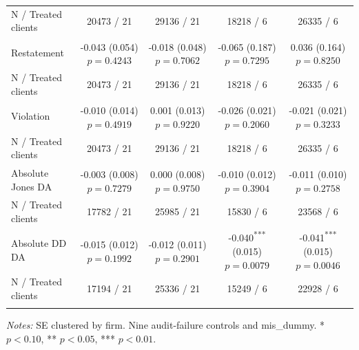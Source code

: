 \documentclass[10pt]{article}
\newcommand{\sym}[1]{\textsuperscript{#1}}
\begin{document}
\begin{tabular*}{\textwidth}{@{\extracolsep{\fill}}lcccc@{}}
N / Treated clients & 20473 / 21 & 29136 / 21 & 18218 / 6 & 26335 / 6 \\ \addlinespace
Restatement & \shortstack{-0.043\sym{}\\(0.054)\\$p=0.4243$} & \shortstack{-0.018\sym{}\\(0.048)\\$p=0.7062$} & \shortstack{-0.065\sym{}\\(0.187)\\$p=0.7295$} & \shortstack{0.036\sym{}\\(0.164)\\$p=0.8250$} \\
N / Treated clients & 20473 / 21 & 29136 / 21 & 18218 / 6 & 26335 / 6 \\ \addlinespace
Violation & \shortstack{-0.010\sym{}\\(0.014)\\$p=0.4919$} & \shortstack{0.001\sym{}\\(0.013)\\$p=0.9220$} & \shortstack{-0.026\sym{}\\(0.021)\\$p=0.2060$} & \shortstack{-0.021\sym{}\\(0.021)\\$p=0.3233$} \\
N / Treated clients & 20473 / 21 & 29136 / 21 & 18218 / 6 & 26335 / 6 \\ \addlinespace
Absolute Jones DA & \shortstack{-0.003\sym{}\\(0.008)\\$p=0.7279$} & \shortstack{0.000\sym{}\\(0.008)\\$p=0.9750$} & \shortstack{-0.010\sym{}\\(0.012)\\$p=0.3904$} & \shortstack{-0.011\sym{}\\(0.010)\\$p=0.2758$} \\
N / Treated clients & 17782 / 21 & 25985 / 21 & 15830 / 6 & 23568 / 6 \\ \addlinespace
Absolute DD DA & \shortstack{-0.015\sym{}\\(0.012)\\$p=0.1992$} & \shortstack{-0.012\sym{}\\(0.011)\\$p=0.2901$} & \shortstack{-0.040\sym{***}\\(0.015)\\$p=0.0079$} & \shortstack{-0.041\sym{***}\\(0.015)\\$p=0.0046$} \\
N / Treated clients & 17194 / 21 & 25336 / 21 & 15249 / 6 & 22928 / 6 \\ \addlinespace
\bottomrule
\end{tabular*}
\par\medskip\fontsize{9}{11}\selectfont\textit{Notes:} SE clustered by firm. Nine audit-failure controls and mis\_dummy. * $p<0.10$, ** $p<0.05$, *** $p<0.01$.
\end{document}
